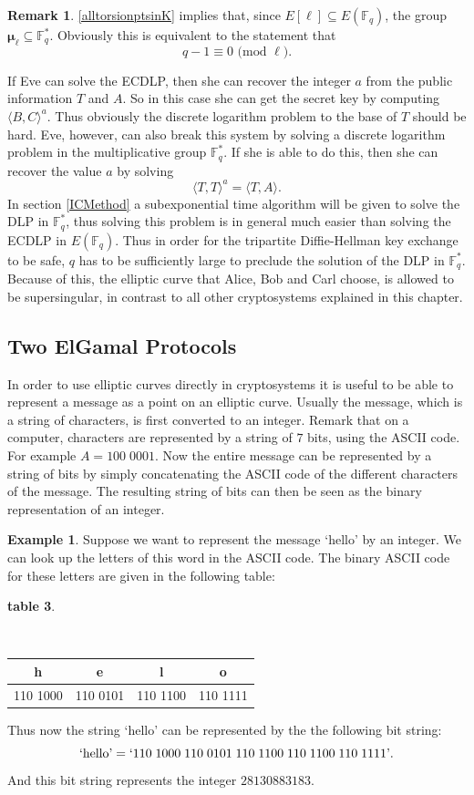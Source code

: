 \documentclass{article}
\numberwithin{equation}{section}
\theoremstyle{definition}
\newtheorem{example}[theorem]{Example}
\newtheorem{remark}[theorem]{Remark}
\newcommand{\FF}[1]{{\mathbb F}_{#1}} %
\newcommand{\rou}[1]{\boldsymbol{\mu}_{#1}} %
\begin{document}
\begin{remark}\label{ROUpartofFF}
\ref{alltorsionptsinK} implies that, since $E[\ell] \subseteq E(\FF{q})$, the group $\rou{\ell} \subseteq \FF{q}^*$. Obviously this is equivalent to the statement that $$q-1 \equiv 0 \text{ (mod } \ell).$$
\end{remark}

If Eve can solve the ECDLP, then she can recover the integer $a$ from the public information $T$ and $A$. So in this case she can get the secret key by computing $\langle B,C \rangle ^a.$ Thus obviously the discrete logarithm problem to the base of $T$ should be hard. Eve, however, can also break this system by solving a discrete logarithm problem in the multiplicative group $\FF{q}^*$. If she is able to do this, then she can recover the value $a$ by solving $$\langle T,T \rangle ^a = \langle T,A \rangle.$$ 
In section \ref{ICMethod} a subexponential time algorithm will be given to solve the DLP in $\FF{q}^*$, thus solving this problem is in general much easier than solving the ECDLP in $E(\FF{q})$. Thus in order for the tripartite Diffie-Hellman key exchange to be safe, $q$ has to be sufficiently large to preclude the solution of the DLP in $\FF{q}^*$. Because of this, the elliptic curve that Alice, Bob and Carl choose, is allowed to be supersingular, in contrast to all other cryptosystems explained in this chapter.


\subsection{Two ElGamal Protocols}\label{ElGamal}
In order to use elliptic curves directly in cryptosystems it is useful to be able to represent a message as a point on an elliptic curve. Usually the message, which is a string of characters, is first converted to an integer. Remark that on a computer, characters are represented by a string of $7$ bits, using the ASCII code. For example $A=100\;0001$. Now the entire message can be represented by a string of bits by simply concatenating the ASCII code of the different characters of the message. The resulting string of bits can then be seen as the binary representation of an integer. 

\begin{example}
Suppose we want to represent the message `hello' by an integer. We can look up the letters of this word in the ASCII code. The binary ASCII code for these letters are given in the following table:
\begin{center}
  \caption{{\bf table 3}.}\\ 
  \begin{tabular}{ | c | c | c |  c |}
    \hline
    h & e & l & o\\ \hline
    110 1000 & 110 0101 & 110 1100 & 110 1111\\ \hline
  \end{tabular}
\end{center}
Thus now the string `hello' can be represented by the the following bit string: $$\text{`hello'} = `110\; 1000 \; 110 \; 0101 \; 110 \; 1100 \; 110 \; 1100 \; 110 \; 1111\text{'}.$$ And this bit string represents the integer $ 28130883183$. 
\end{example}
\end{document}
